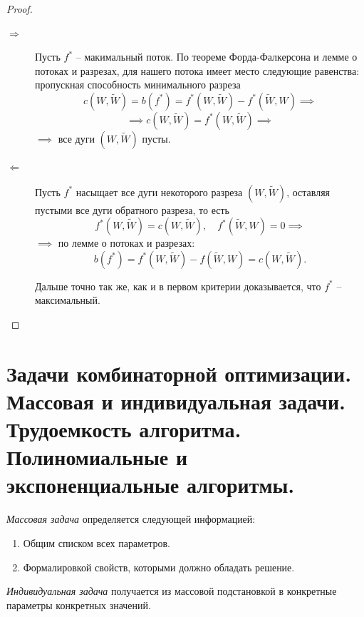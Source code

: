 \begin{proof}\leavevmode
    \begin{description}
        \item[$ \boxed{\Rightarrow} $] Пусть $ f^* $ -- макимальный поток. По теореме Форда-Фалкерсона и лемме о потоках и разрезах, для нашего потока имеет место следующие равенства: пропускная способность минимального разреза
              \[
                  c(W,\widetilde{W}) = b(f^*) = f^*(W,\widetilde{W}) - f^*(\widetilde{W},W) \implies
              \]
              \[
                  \implies c(W,\widetilde{W}) = f^*(W,\widetilde{W}) \implies
              \]
              $ \implies $ все дуги $ (W,\widetilde{W}) $ пусты.

        \item[$ \boxed{\Leftarrow} $] Пусть $ f^* $ насыщает все дуги некоторого разреза $ (W,\widetilde{W}) $, оставляя пустыми все дуги обратного разреза, то есть
              \[
                  f^*(W,\widetilde{W}) = c(W,\widetilde{W}), \quad f^*(\widetilde{W},W) = 0 \implies
              \]
              $ \implies $ по лемме о потоках и разрезах:
              \[
                  b(f^*) = f^*(W,\widetilde{W}) - f(\widetilde{W},W) = c(W,\widetilde{W}).
              \]

              Дальше точно так же, как и в первом критерии доказывается, что $ f^* $ -- максимальный.
    \end{description}
\end{proof}

\newpage

\section{Задачи комбинаторной оптимизации. Массовая и индивидуальная задачи. Трудоемкость алгоритма. Полиномиальные и экспоненциальные алгоритмы.}

\begin{definition}
    \emph{Массовая задача} определяется следующей информацией:
    \begin{enumerate}
        \item Общим списком всех параметров.
        \item Формалировкой свойств, которыми должно обладать решение.
    \end{enumerate}
\end{definition}

\begin{definition}
    \emph{Индивидуальная задача} получается из массовой подстановкой в конкретные параметры конкретных значений.
\end{definition}

